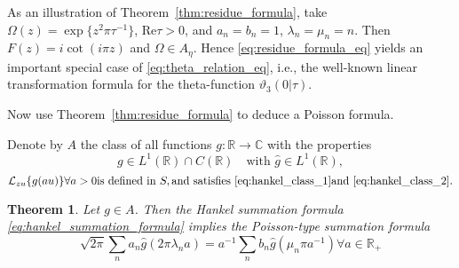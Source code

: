 \documentclass{article}
\newtheorem{theorem}{Theorem}
\begin{document}
\begin{remark}
  \label{rem:theta_special}As an illustration of
  Theorem~\ref{thm:residue_formula}, take $\Omega (z) = \exp \{z^2 \pi \tau^{-
  1} \}$, $\mathrm{Re} \tau > 0$, and $a_n = b_n = 1$, $\lambda_n = \mu_n =
  n$. Then $F (z) = i \cot (i \pi z)$ and $\Omega \in A_{\eta}$. Hence
  \eqref{eq:residue_formula_eq} yields an important special case of
  \eqref{eq:theta_relation_eq}, i.e., the well-known linear transformation
  formula for the theta-function $\vartheta_3 (0| \tau)$.
\end{remark}

Now use Theorem~\ref{thm:residue_formula} to deduce a Poisson formula.

Denote by $A$ the class of all functions $g : \mathbb{R} \to \mathbb{C}$ with
the properties
\begin{equation}
  g \in L^1 (\mathbb{R}) \cap C (\mathbb{R}) \quad \text{with } \hat{g} \in
  L^1 (\mathbb{R}), \label{eq:class_A_prop_1}
\end{equation}
\begin{equation}
  \mathcal{L}_{zu}  \{g (au)\} \forall a > 0 \text{is defined in } S,
  \text{and satisfies } \eqref{eq:hankel_class_1} \text{and }
  \eqref{eq:hankel_class_2} . \label{eq:class_A_prop_2}
\end{equation}
\begin{theorem}
  \label{thm:poisson_type}Let $g \in A$. Then the Hankel summation formula
  \eqref{eq:hankel_summation_formula} implies the Poisson-type summation
  formula
  \begin{equation}
    \sqrt{2 \pi}  \sum_n a_n  \hat{g} (2 \pi \lambda_n a) = a^{- 1}  \sum_n
    b_n  \hat{g} (\mu_n \pi a^{- 1}) \forall a \in \mathbb{R}_+
    \label{eq:poisson_summation}
  \end{equation}
\end{theorem}
\end{document}
